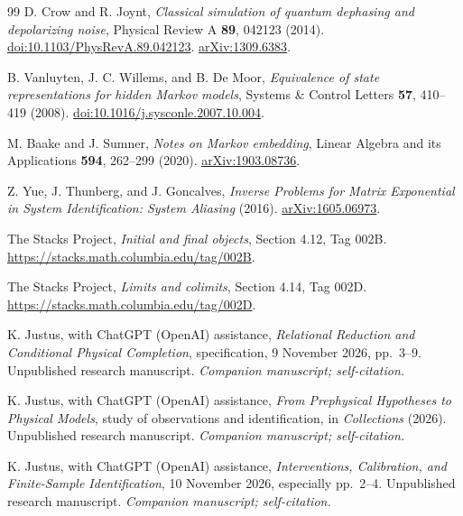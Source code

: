 \documentclass[11pt,letterpaper]{article}
\begin{document}
\begin{thebibliography}{99}
D. Crow and R. Joynt, \emph{Classical simulation of quantum dephasing and
depolarizing noise}, Physical Review A \textbf{89}, 042123 (2014).
\href{https://doi.org/10.1103/PhysRevA.89.042123}{doi:10.1103/PhysRevA.89.042123}.
\href{https://arxiv.org/abs/1309.6383}{arXiv:1309.6383}.

B. Vanluyten, J. C. Willems, and B. De Moor,
\emph{Equivalence of state representations for hidden Markov models},
Systems \& Control Letters \textbf{57}, 410--419 (2008).
\href{https://doi.org/10.1016/j.sysconle.2007.10.004}{doi:10.1016/j.sysconle.2007.10.004}.

M. Baake and J. Sumner, \emph{Notes on Markov embedding},
Linear Algebra and its Applications \textbf{594}, 262--299 (2020).
\href{https://arxiv.org/abs/1903.08736}{arXiv:1903.08736}.

Z. Yue, J. Thunberg, and J. Goncalves,
\emph{Inverse Problems for Matrix Exponential in System Identification:
System Aliasing} (2016).
\href{https://arxiv.org/abs/1605.06973}{arXiv:1605.06973}.

The Stacks Project, \emph{Initial and final objects},
Section 4.12, Tag 002B.
\url{https://stacks.math.columbia.edu/tag/002B}.

The Stacks Project, \emph{Limits and colimits},
Section 4.14, Tag 002D.
\url{https://stacks.math.columbia.edu/tag/002D}.

K. Justus, with ChatGPT (OpenAI) assistance,
\emph{Relational Reduction and Conditional Physical Completion},
specification, 9 November 2026, pp.~3--9.
Unpublished research manuscript.
\emph{Companion manuscript; self-citation.}

K. Justus, with ChatGPT (OpenAI) assistance,
\emph{From Prephysical Hypotheses to Physical Models},
study of observations and identification, in \emph{Collections} (2026).
Unpublished research manuscript.
\emph{Companion manuscript; self-citation.}

K. Justus, with ChatGPT (OpenAI) assistance,
\emph{Interventions, Calibration, and Finite-Sample Identification},
10 November 2026, especially pp.~2--4.
Unpublished research manuscript.
\emph{Companion manuscript; self-citation.}
\end{thebibliography}
\end{document}
